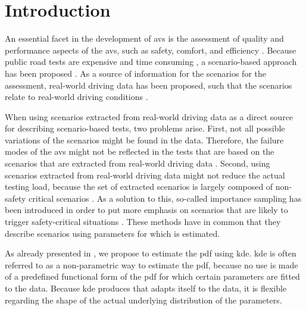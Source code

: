 \section{Introduction}
\label{sec:introduction}

An essential facet in the development of \acp{av} is the assessment of quality and performance aspects of the \acp{av}, such as safety, comfort, and efficiency \autocite{bengler2014threedecades, stellet2015taxonomy, koopman2016challenges}. 
Because public road tests are expensive and time consuming \autocite{kalra2016driving, zhao2018evaluation}, a scenario-based approach has been proposed \autocite{riedmaier2020survey, elrofai2018scenario, putz2017pegasus, krajewski2018highD, deGelder2017assessment, stellet2015taxonomy, jacobo2019development}.
As a source of information for the scenarios for the assessment, real-world driving data has been proposed, such that the scenarios relate to real-world driving conditions \autocite{elrofai2018scenario, putz2017pegasus, krajewski2018highD}.

When using scenarios extracted from real-world driving data as a direct source for describing scenario-based tests, two problems arise.
First, not all possible variations of the scenarios might be found in the data. 
Therefore, the failure modes of the \acp{av} might not be reflected in the tests that are based on the scenarios that are extracted from real-world driving data \autocite{zhao2018evaluation}.
Second, using scenarios extracted from real-world driving data might not reduce the actual testing load, because the set of extracted scenarios is largely composed of non-safety critical scenarios \autocite{zhao2018evaluation}.
As a solution to this, so-called importance sampling has been introduced in order to put more emphasis on scenarios that are likely to trigger safety-critical situations \autocite{deGelder2017assessment, xu2018accelerated, zhao2018evaluation, jesenski2020scalable}.
These methods \autocite{deGelder2017assessment, xu2018accelerated, zhao2018evaluation, jesenski2020scalable} have in common that they describe scenarios using parameters for which  is estimated.

As already presented in \autocite{deGelder2017assessment, degelder2019risk}, we propose to estimate the \ac{pdf} using \ac{kde}.
\ac{kde} \autocite{parzen1962estimation, rosenblatt1956remarks} is often referred to as a non-parametric way to estimate the \ac{pdf}, because no use is made of a predefined functional form of the \ac{pdf} for which certain parameters are fitted to the data. 
\cstarta Because \ac{kde} produces  that adapts itself to the data, it is flexible regarding the shape of the actual underlying distribution of the parameters. \cenda

